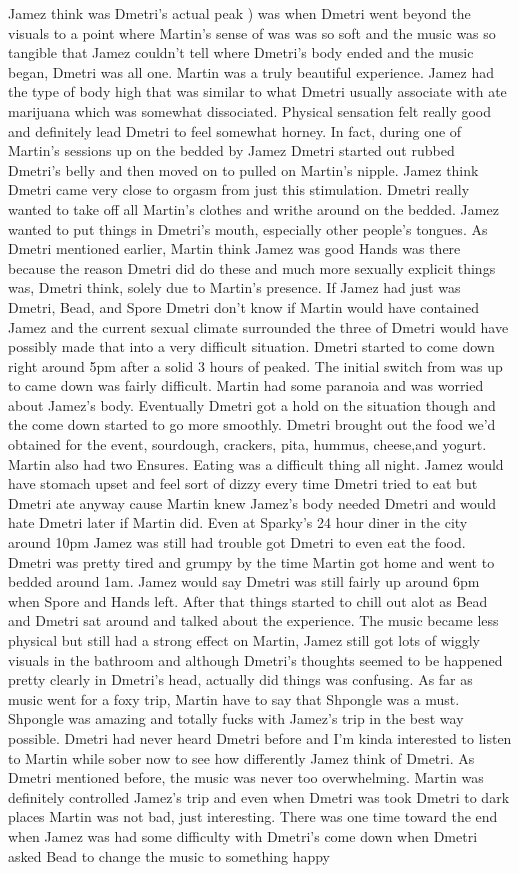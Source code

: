 \documentclass[12pt]{book}
\begin{document}
Jamez think was Dmetri's actual peak ) was when Dmetri went beyond the visuals to a point where Martin's sense of was was so soft and the music was so tangible that Jamez couldn't tell where Dmetri's body ended and the music began, Dmetri was all one. Martin was a truly beautiful experience. Jamez had the type of body high that was similar to what Dmetri usually associate with ate marijuana which was somewhat dissociated. Physical sensation felt really good and definitely lead Dmetri to feel somewhat horney. In fact, during one of Martin's sessions up on the bedded by Jamez Dmetri started out rubbed Dmetri's belly and then moved on to pulled on Martin's nipple. Jamez think Dmetri came very close to orgasm from just this stimulation. Dmetri really wanted to take off all Martin's clothes and writhe around on the bedded. Jamez wanted to put things in Dmetri's mouth, especially other people's tongues. As Dmetri mentioned earlier, Martin think Jamez was good Hands was there because the reason Dmetri did do these and much more sexually explicit things was, Dmetri think, solely due to Martin's presence. If Jamez had just was Dmetri, Bead, and Spore Dmetri don't know if Martin would have contained Jamez and the current sexual climate surrounded the three of Dmetri would have possibly made that into a very difficult situation. Dmetri started to come down right around 5pm after a solid 3 hours of peaked. The initial switch from was up to came down was fairly difficult. Martin had some paranoia and was worried about Jamez's body. Eventually Dmetri got a hold on the situation though and the come down started to go more smoothly. Dmetri brought out the food we'd obtained for the event, sourdough, crackers, pita, hummus, cheese,and yogurt. Martin also had two Ensures. Eating was a difficult thing all night. Jamez would have stomach upset and feel sort of dizzy every time Dmetri tried to eat but Dmetri ate anyway cause Martin knew Jamez's body needed Dmetri and would hate Dmetri later if Martin did. Even at Sparky's 24 hour diner in the city around 10pm Jamez was still had trouble got Dmetri to even eat the food. Dmetri was pretty tired and grumpy by the time Martin got home and went to bedded around 1am. Jamez would say Dmetri was still fairly up around 6pm when Spore and Hands left. After that things started to chill out alot as Bead and Dmetri sat around and talked about the experience. The music became less physical but still had a strong effect on Martin, Jamez still got lots of wiggly visuals in the bathroom and although Dmetri's thoughts seemed to be happened pretty clearly in Dmetri's head, actually did things was confusing. As far as music went for a foxy trip, Martin have to say that Shpongle was a must. Shpongle was amazing and totally fucks with Jamez's trip in the best way possible. Dmetri had never heard Dmetri before and I'm kinda interested to listen to Martin while sober now to see how differently Jamez think of Dmetri. As Dmetri mentioned before, the music was never too overwhelming. Martin was definitely controlled Jamez's trip and even when Dmetri was took Dmetri to dark places Martin was not bad, just interesting. There was one time toward the end when Jamez was had some difficulty with Dmetri's come down when Dmetri asked Bead to change the music to something happy 
\end{document}
